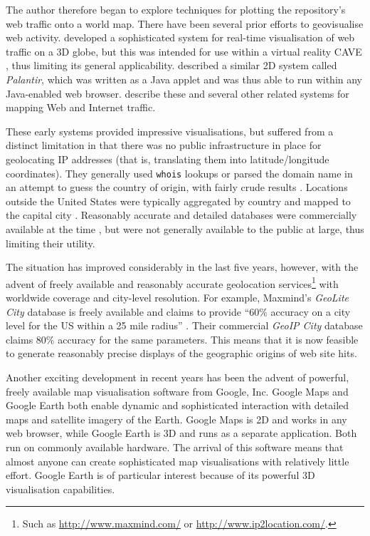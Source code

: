 \documentclass[10pt]{article}
\begin{document}
The author therefore began to explore techniques for plotting the repository's web traffic onto a world map. There have been several prior efforts to geovisualise web activity.  developed a sophisticated system for real-time visualisation of web traffic on a 3D globe, but this was intended for use within a virtual reality CAVE \cite{CrNe-C-1992-CAVE}, thus limiting its general applicability.  described a similar 2D system called \emph{Palantir}, which was written as a Java applet and was thus able to run within any Java-enabled web browser.  describe these and several other related systems for mapping Web and Internet traffic.

These early systems provided impressive visualisations, but suffered from a distinct limitation in that there was no public infrastructure in place for geolocating IP addresses (that is, translating them into latitude/longitude coordinates). They generally used \texttt{whois} lookups or parsed the domain name in an attempt to guess the country of origin, with fairly crude results \cite{Lamm-SE-1996-webvis}. Locations outside the United States were typically aggregated by country and mapped to the capital city \cite{Lamm-SE-1996-webvis,Papa-N-1998-Palantir,Jian-B-2000-cybermap}. Reasonably accurate and detailed databases were commercially available at the time \cite[p.\ 1466]{Lamm-SE-1996-webvis}, but were not generally available to the public at large, thus limiting their utility.

The situation has improved considerably in the last five years, however, with the advent of freely available and reasonably accurate geolocation services\footnote{Such as \url{http://www.maxmind.com/} or \url{http://www.ip2location.com/}.} with worldwide coverage and city-level resolution. For example, Maxmind's \emph{GeoLite City} database is freely available and claims to provide ``60\% accuracy on a city level for the US within a 25 mile radius'' \cite{Maxm-G-2006-GeoLiteCity}. Their commercial \emph{GeoIP City} database claims 80\% accuracy for the same parameters. This means that it is now feasible to generate reasonably precise displays of the geographic origins of web site hits.

Another exciting development in recent years has been the advent of powerful, freely available map visualisation software from Google, Inc. Google Maps and Google Earth both enable dynamic and sophisticated interaction with detailed maps and satellite imagery of the Earth. Google Maps is 2D and works in any web browser, while Google Earth is 3D and runs as a separate application. Both run on commonly available hardware. The arrival of this software means that almost anyone can create sophisticated map visualisations with relatively little effort. Google Earth is of particular interest because of its powerful 3D visualisation capabilities.
\end{document}
